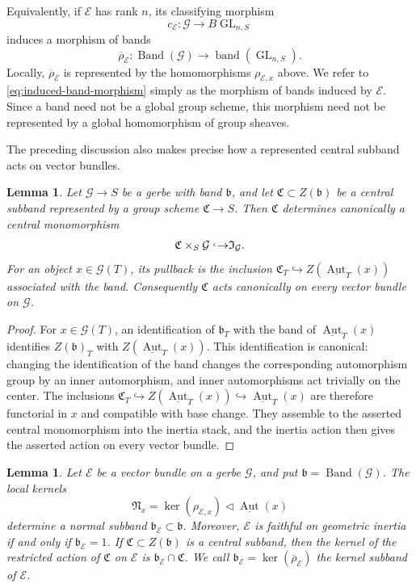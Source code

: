 \documentclass[11pt,reqno]{amsart}
\numberwithin{equation}{section}
\theoremstyle{plain}
\newtheorem{lemm}[prop]{Lemma}
\theoremstyle{definition}
\def\cG{{\mathcal G}}
\def\cE{{\mathcal E}}
\def\fC{{\mathfrak C}}
\def\fI{{\mathfrak I}}
\def\fN{{\mathfrak N}}
\def\Aut{{\operatorname{Aut}}}
\def\ra{{\rightarrow}}
\def\band{{\mathfrak b}}
\begin{document}
Equivalently, if $\cE$ has rank $n$, its classifying morphism
\[
c_{\cE}:\cG\ra B\operatorname{GL}_{n,S}
\]
induces a morphism of bands
\begin{equation}\label{eq:induced-band-morphism}
\overline\rho_{\cE}:
\operatorname{Band}(\cG)\ra
\operatorname{band}(\operatorname{GL}_{n,S}).
\end{equation}
Locally, $\overline\rho_{\cE}$ is represented by the homomorphisms
$\rho_{\cE,x}$ above.  We refer to
\eqref{eq:induced-band-morphism} simply as the morphism of bands induced
by $\cE$.  Since a band need not be a global group scheme, this morphism
need not be represented by a global homomorphism of group sheaves.

The preceding discussion also makes precise how a represented central
subband acts on vector bundles.

\begin{lemm}\label{lem:central-subband-inertia}
Let $\cG\to S$ be a gerbe with band $\band$, and let
$\fC\subset Z(\band)$ be a central subband represented by a group
scheme $\fC\to S$.  Then $\fC$ determines canonically a central
monomorphism
\[
\fC\times_S\cG\lhook\joinrel\ra\fI_{\cG}.
\]
For an object $x\in\cG(T)$, its pullback is the inclusion
$\fC_T\hookrightarrow Z(\underline{\Aut}_T(x))$ associated with the
band.  Consequently $\fC$ acts canonically on every vector bundle on
$\cG$.
\end{lemm}

\begin{proof}
For $x\in\cG(T)$, an identification of $\band_T$ with the band of
$\underline{\Aut}_T(x)$ identifies $Z(\band)_T$ with
$Z(\underline{\Aut}_T(x))$.  This identification is canonical: changing
the identification of the band changes the corresponding automorphism
group by an inner automorphism, and inner automorphisms act trivially on
the center.  The inclusions
$\fC_T\hookrightarrow Z(\underline{\Aut}_T(x))\hookrightarrow
\underline{\Aut}_T(x)$ are therefore functorial in $x$ and compatible
with base change.  They assemble to the asserted central monomorphism into
the inertia stack, and the inertia action then gives the asserted action on
every vector bundle.
\end{proof}

\begin{lemm}\label{lem:kernel-subband}
Let $\cE$ be a vector bundle on a gerbe $\cG$, and put
$\band=\operatorname{Band}(\cG)$.  The local kernels
\[
\fN_x=\ker(\rho_{\cE,x})\triangleleft\underline{\Aut}(x)
\]
determine a normal subband $\band_{\cE}\subset\band$.  Moreover, $\cE$ is
faithful on geometric inertia if and only if $\band_{\cE}=1$.  If
$\fC\subset Z(\band)$ is a central subband, then the kernel of the
restricted action of $\fC$ on $\cE$ is $\band_{\cE}\cap\fC$.
We call $\band_{\cE}=\ker(\overline\rho_{\cE})$ the kernel subband of $\cE$.
\end{lemm}
\end{document}
